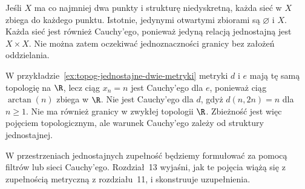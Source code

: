 \begin{przyklad}
\label{ex:topog-jednostajne-niehausdorff}
Jeśli $X$ ma co najmniej dwa punkty
i strukturę niedyskretną, każda sieć
w $X$ zbiega do każdego punktu.
Istotnie, jedynymi otwartymi zbiorami
są $\varnothing$ i $X$. Każda sieć
jest również Cauchy'ego, ponieważ
jedyną relacją jednostajną jest $X\times X$.
Nie można zatem oczekiwać jednoznaczności
granicy bez założeń oddzielania.
\end{przyklad}

\begin{przyklad}
\label{ex:topog-jednostajne-cauchy-dwie-metryki}
W przykładzie~\ref{ex:topog-jednostajne-dwie-metryki}
metryki $d$ i $e$ mają tę samą topologię na $\R$,
lecz ciąg $x_n=n$ jest Cauchy'ego dla $e$,
ponieważ ciąg $\arctan(n)$ zbiega w $\R$.
Nie jest Cauchy'ego dla $d$, gdyż
$d(n,2n)=n$ dla $n\ge1$. Nie ma również
granicy w zwykłej topologii $\R$.
Zbieżność jest więc pojęciem topologicznym,
ale warunek Cauchy'ego zależy od struktury
jednostajnej.
\end{przyklad}

\begin{uwaga}
W przestrzeniach jednostajnych zupełność
będziemy formułować za pomocą filtrów
lub sieci Cauchy'ego. Rozdział~13
wyjaśni, jak te pojęcia wiążą się
z zupełnością metryczną z rozdziału~11,
i skonstruuje uzupełnienia.
\end{uwaga}
